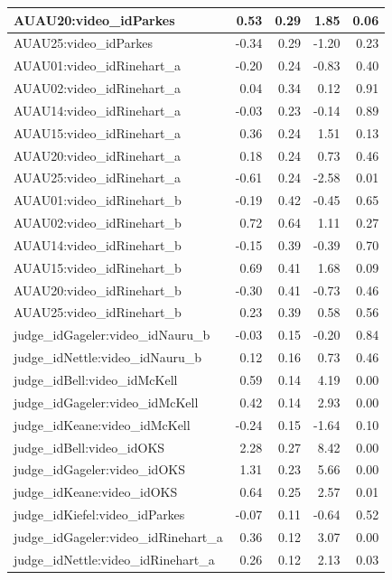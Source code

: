\documentclass{monashthesis}
\begin{document}
\begin{tabular}{l|r|r|r|r}
\hline
AUAU20:video\_idParkes & 0.53 & 0.29 & 1.85 & 0.06\\
\hline
AUAU25:video\_idParkes & -0.34 & 0.29 & -1.20 & 0.23\\
\hline
AUAU01:video\_idRinehart\_a & -0.20 & 0.24 & -0.83 & 0.40\\
\hline
AUAU02:video\_idRinehart\_a & 0.04 & 0.34 & 0.12 & 0.91\\
\hline
AUAU14:video\_idRinehart\_a & -0.03 & 0.23 & -0.14 & 0.89\\
\hline
AUAU15:video\_idRinehart\_a & 0.36 & 0.24 & 1.51 & 0.13\\
\hline
AUAU20:video\_idRinehart\_a & 0.18 & 0.24 & 0.73 & 0.46\\
\hline
AUAU25:video\_idRinehart\_a & -0.61 & 0.24 & -2.58 & 0.01\\
\hline
AUAU01:video\_idRinehart\_b & -0.19 & 0.42 & -0.45 & 0.65\\
\hline
AUAU02:video\_idRinehart\_b & 0.72 & 0.64 & 1.11 & 0.27\\
\hline
AUAU14:video\_idRinehart\_b & -0.15 & 0.39 & -0.39 & 0.70\\
\hline
AUAU15:video\_idRinehart\_b & 0.69 & 0.41 & 1.68 & 0.09\\
\hline
AUAU20:video\_idRinehart\_b & -0.30 & 0.41 & -0.73 & 0.46\\
\hline
AUAU25:video\_idRinehart\_b & 0.23 & 0.39 & 0.58 & 0.56\\
\hline
judge\_idGageler:video\_idNauru\_b & -0.03 & 0.15 & -0.20 & 0.84\\
\hline
judge\_idNettle:video\_idNauru\_b & 0.12 & 0.16 & 0.73 & 0.46\\
\hline
judge\_idBell:video\_idMcKell & 0.59 & 0.14 & 4.19 & 0.00\\
\hline
judge\_idGageler:video\_idMcKell & 0.42 & 0.14 & 2.93 & 0.00\\
\hline
judge\_idKeane:video\_idMcKell & -0.24 & 0.15 & -1.64 & 0.10\\
\hline
judge\_idBell:video\_idOKS & 2.28 & 0.27 & 8.42 & 0.00\\
\hline
judge\_idGageler:video\_idOKS & 1.31 & 0.23 & 5.66 & 0.00\\
\hline
judge\_idKeane:video\_idOKS & 0.64 & 0.25 & 2.57 & 0.01\\
\hline
judge\_idKiefel:video\_idParkes & -0.07 & 0.11 & -0.64 & 0.52\\
\hline
judge\_idGageler:video\_idRinehart\_a & 0.36 & 0.12 & 3.07 & 0.00\\
\hline
judge\_idNettle:video\_idRinehart\_a & 0.26 & 0.12 & 2.13 & 0.03\\

\end{tabular}
\end{document}
